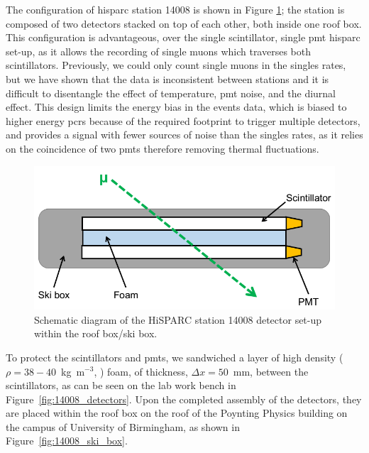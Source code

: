 The configuration of \gls{hisparc} station 14008 is shown in Figure \ref{fig:14008_config}; the station is composed of two detectors stacked on top of each other, both inside one roof box. This configuration is advantageous, over the single scintillator, single \gls{pmt} \gls{hisparc} set-up, as it allows the recording of single muons which traverses both scintillators. Previously, we could only count single muons in the singles rates, but we have shown that the data is inconsistent between stations and it is difficult to disentangle the effect of temperature, \gls{pmt} noise, and the diurnal effect. This design limits the energy bias in the events data, which is biased to higher energy \glspl{pcr} because of the required footprint to trigger multiple detectors, and provides a signal with fewer sources of noise than the singles rates, as it relies on the coincidence of two \glspl{pmt} therefore removing thermal fluctuations.

\begin{figure}[ht!]
	\center
	\includegraphics[width=0.75\columnwidth]{14008_config.png}
	\caption{Schematic diagram of the HiSPARC station 14008 detector set-up within the roof box/ski box.}
	\label{fig:14008_config}
\end{figure}

To protect the scintillators and \glspl{pmt}, we sandwiched a layer of high density ($\rho = 38-40$~kg~m$^{-3}$, \citet{efoam_sf38_2017}) foam, of thickness, $\Delta x = 50$~mm, between the scintillators, as can be seen on the lab work bench in Figure~\ref{fig:14008_detectors}. Upon the completed assembly of the detectors, they are placed within the roof box on the roof of the Poynting Physics building on the campus of University of Birmingham, as shown in Figure~\ref{fig:14008_ski_box}.

